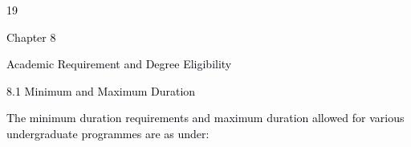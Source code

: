 \documentclass[12pt]{article}
\begin{document}
\vspace{\baselineskip}

\vspace{\baselineskip}
\begin{Center}
\textcolor[HTML]{00000A}{19}
\end{Center}\par


\vspace{\baselineskip}
{\fontsize{14pt}{16.8pt}\selectfont \textcolor[HTML]{00000A}{Chapter 8}\par}\par


\vspace{\baselineskip}
{\fontsize{20pt}{24.0pt}\selectfont \textcolor[HTML]{00000A}{Academic Requirement and Degree Eligibility}\par}\par


\vspace{\baselineskip}
\textcolor[HTML]{00000A}{8.1 Minimum and Maximum Duration}\par


\vspace{\baselineskip}
{\fontsize{9pt}{10.8pt}\selectfont \textcolor[HTML]{00000A}{The minimum duration requirements and maximum duration allowed for various undergraduate programmes are as under:}\par}\par


\vspace{\baselineskip}


\end{document}
